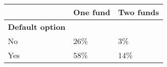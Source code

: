 \begin{center}
\footnotesize
{}
\begin{tabularx} {6.5cm} {@{} l Y Y @{}}
\toprule
 & \textbf{One fund} & \textbf{Two funds} \\

\midrule 
\textbf{Default option} \\
No & 26\% & 3\% \\
Yes & 58\% & 14\% \\
\bottomrule
\end{tabularx}
\normalsize
\end{center}
